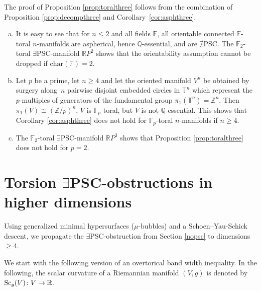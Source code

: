 \documentclass[10pt,a4paper]{amsart}
\numberwithin{equation}{section}
\newcommand{\F}{\mathbb{F}}
\newcommand{\Z}{\mathbb{Z}}
\newcommand{\R}{\mathbb{R}}
\newcommand{\TTT}{\mathbb{T}}
\newcommand{\charac}{\mathrm{char}}
\newcommand{\Sc}{{\rm Sc}}
\newcommand{\no}{{\color{brown!70!black}$\nexists$}{\sf PSC}}
\newcommand{\yes}{{\color {blue!70!black}$\exists$}{\sf PSC}}
\begin{document}
The proof of Proposition \ref{prop:toralthree} follows from the combination of Proposition \ref{prop:decompthree} and Corollary~\ref{cor:asphthree}.

\begin{Remark} \label{rem:mixed}\quad
\begin{enumerate}[(a)]\itemsep=0pt
\item \label{leqzwei} It is easy to see that for $n \leq 2$ and all fields $\F$, all orientable connected $ \F$-toral $n$-manifolds are aspherical, hence $\mathbb{Q}$-essential, and are \no.
The $\F_2$-toral \yes-manifold $\mathbb{R}P^2$ shows that the orientability assumption cannot be dropped if $\charac(\F) = 2$.
\item \label{notinge4} Let $p$ be a prime, let $n \geq 4$ and let the oriented manifold $V^n$ be obtained by surgery along~$n$ pairwise disjoint embedded circles in $\TTT^n$ which represent the $p$-multiples of generators of the fundamental group $\pi_1({\TTT}^n) = \Z^n$.
Then $\pi_1(V) \cong (\Z/p)^n$, $V$ is $\F_p$-toral, but $V$ is not $\mathbb{Q}$-essential.
This shows that Corollary \ref{cor:asphthree} does not hold for $\F_p$-toral $n$-manifolds if $n \geq 4$.
\item The $\F_2$-toral \yes-manifold $\mathbb{R} P^3$ shows that Proposition \ref{prop:toralthree} does not hold for $p= 2$.
\end{enumerate}
\end{Remark}

\section[Torsion PSC-obstructions in higher dimensions]{Torsion \yes-obstructions in higher dimensions}

Using generalized minimal hypersurfaces ($\mu$-bubbles) and a Schoen--Yau-Schick descent, we propagate the \yes-obstruction from Section \ref{nopsc} to dimensions $\geq 4$.

We start with the following version of an overtorical band width inequality.
In the following, the scalar curvature of a Riemannian manifold $(V,g)$ is denoted by $\Sc_g(V) \colon V \to \R$.
\end{document}
